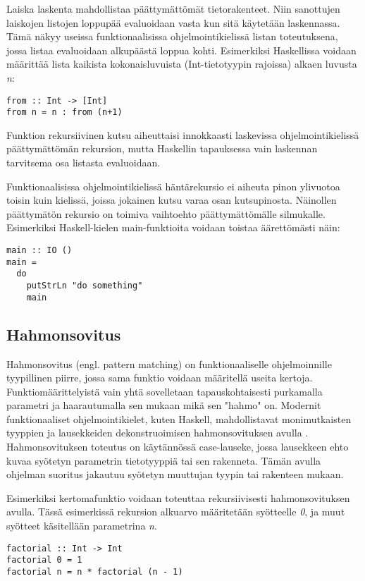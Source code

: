 Laiska laskenta mahdollistaa päättymättömät tietorakenteet. Niin sanottujen laiskojen listojen loppupää evaluoidaan
vasta kun sitä käytetään laskennassa. Tämä näkyy useissa funktionaalisissa ohjelmointikielissä listan toteutuksena,
jossa listaa evaluoidaan alkupäästä loppua kohti. Esimerkiksi Haskellissa voidaan määrittää lista kaikista
kokonaisluvuista (Int-tietotyypin rajoissa) alkaen luvusta \textit{n}:
\begin{verbatim}
from :: Int -> [Int]
from n = n : from (n+1)
\end{verbatim}
Funktion rekursiivinen kutsu aiheuttaisi innokkaasti laskevissa ohjelmointikielissä päättymättömän rekursion, mutta
Haskellin tapauksessa vain laskennan tarvitsema osa listasta evaluoidaan. \cite{languagedesign}

Funktionaalisissa ohjelmointikielissä häntärekursio ei aiheuta pinon ylivuotoa toisin kuin kielissä, joissa jokainen
kutsu varaa osan kutsupinosta. Näinollen päättymätön rekursio on toimiva vaihtoehto päättymättömälle silmukalle.
Esimerkiksi Haskell-kielen main-funktioita voidaan toistaa äärettömästi näin:
\begin{verbatim}
main :: IO ()
main =
  do
    putStrLn "do something"
    main
\end{verbatim}

\subsection{Hahmonsovitus}
Hahmonsovitus (engl. pattern matching) on funktionaaliselle ohjelmoinnille tyypillinen piirre, jossa sama funktio
voidaan määritellä useita kertoja. Funktiomäärittelyistä vain yhtä sovelletaan tapauskohtaisesti purkamalla parametri
ja haarautumalla sen mukaan mikä sen "hahmo" on. Modernit funktionaaliset ohjelmointikielet, kuten Haskell,
mahdollistavat monimutkaisten tyyppien ja lausekkeiden dekonstruoimisen hahmonsovituksen avulla \cite{learnhaskell}.
Hahmonsovituksen toteutus on käytännössä case-lauseke, jossa lausekkeen ehto kuvaa syötetyn parametrin tietotyyppiä tai
sen rakenneta. Tämän avulla ohjelman suoritus jakautuu syötetyn muuttujan tyypin tai rakenteen mukaan. \cite{hudak}

Esimerkiksi kertomafunktio voidaan toteuttaa rekursiivisesti hahmonsovituksen avulla. Tässä esimerkissä rekursion
alkuarvo määritetään syötteelle \textit{0}, ja muut syötteet käsitellään parametrina \textit{n}.
\begin{verbatim}
factorial :: Int -> Int
factorial 0 = 1
factorial n = n * factorial (n - 1)
\end{verbatim}


